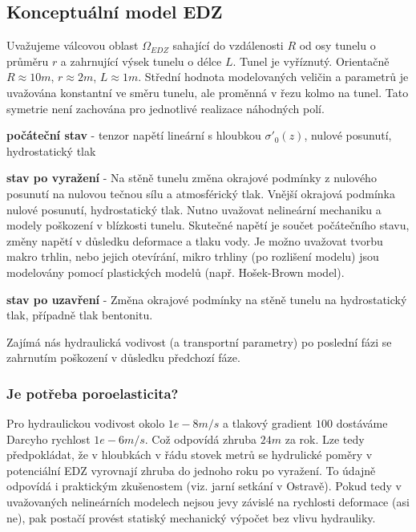 \documentclass{article}
\begin{document}
\subsection{Konceptuální model EDZ}
Uvažujeme válcovou oblast $\Omega_{EDZ}$ sahající do vzdálenosti $R$ od osy tunelu o průměru $r$ a 
zahrnující výsek tunelu o délce $L$. Tunel je vyříznutý. Orientačně $R\approx 10m$, $r\approx 2m$, $L\approx 1m$. 
Střední hodnota modelovaných veličin a parametrů je uvažována konstantní ve směru tunelu, ale 
proměnná v řezu kolmo na tunel. Tato symetrie není zachována pro jednotlivé realizace náhodných polí.

{\bf počáteční stav} - tenzor napětí lineární s hloubkou $\sigma'_0(z)$, nulové posunutí, hydrostatický tlak
                       
{\bf stav po vyražení} - Na stěně tunelu změna okrajové podmínky z nulového posunutí na nulovou tečnou sílu a 
                         atmosférický tlak. Vnější okrajová podmínka nulové posunutí, hydrostatický tlak.
                         Nutno uvažovat nelineární mechaniku a modely poškození v blízkosti tunelu.
                         Skutečné napětí je součet počátečního stavu, změny napětí v důsledku deformace a tlaku vody.
                         Je možno uvažovat tvorbu makro trhlin, nebo jejich otevírání, mikro trhliny (po rozlišení modelu)
                         jsou modelovány pomocí plastických modelů (např. Hošek-Brown model).
                         
{\bf stav po uzavření} - Změna okrajové podmínky na stěně tunelu na hydrostatický tlak, případně tlak bentonitu.
                         
Zajímá nás hydraulická vodivost (a transportní parametry) po poslední fázi se zahrnutím poškození 
v důsledku předchozí fáze.

\subsubsection{Je potřeba poroelasticita?}
Pro hydraulickou vodivost okolo $1e-8 m/s$ a tlakový gradient $100$ dostáváme Darcyho rychlost 
$1e-6 m/s$. Což odpovídá zhruba $24m$ za rok. Lze tedy předpokládat, že v hloubkách v řádu 
stovek metrů se hydrulické poměry v potenciální EDZ vyrovnají zhruba do jednoho roku po vyražení. 
To údajně odpovídá i praktickým zkušenostem (viz. jarní setkání v Ostravě). 
Pokud tedy v uvažovaných nelineárních modelech nejsou jevy závislé na rychlosti deformace (asi ne),
pak postačí provést statiský mechanický výpočet bez vlivu hydrauliky.
\end{document}

